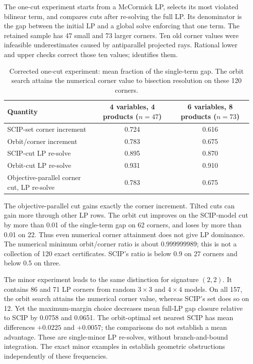 The one-cut experiment starts from a McCormick LP, selects its most
violated bilinear term, and compares cuts after re-solving the full LP.
Its denominator is the gap between the initial LP and a global solve
enforcing that one term. The retained sample has 47 small and 73 larger
corners. Ten old corner values were infeasible underestimates caused by
antiparallel projected rays. Rational lower and upper checks correct those
ten values;  identifies them.

\begin{table}[t]
\centering
\caption{Corrected one-cut experiment: mean fraction of the single-term
gap. The orbit search attains the numerical corner value to bisection
resolution on these 120 corners.}
\label{exp:one-cut-table}
\begin{tabular}{@{}p{}cc@{}}
\toprule
Quantity & \shortstack{4 variables, 4 products\\($n=47$)} & \shortstack{6 variables, 8 products\\($n=73$)} \\
\midrule
SCIP-set corner increment & 0.724 & 0.616 \\
Orbit/corner increment & 0.783 & 0.675 \\
SCIP-cut LP re-solve & 0.895 & 0.870 \\
Orbit-cut LP re-solve & 0.931 & 0.910 \\
Objective-parallel corner cut, LP re-solve & 0.783 & 0.675 \\
\bottomrule
\end{tabular}
\end{table}

The objective-parallel cut gains exactly the corner increment. Tilted
cuts can gain more through other LP rows. The orbit cut improves on the
SCIP-model cut by more than 0.01 of the single-term gap on 62 corners,
and loses by more than 0.01 on 22. Thus even numerical corner attainment
does not give LP dominance. The numerical minimum orbit/corner ratio is
about $0.999999989$; this is not a collection of 120 exact certificates.
SCIP's ratio is below 0.9 on 27 corners and below 0.5 on three.

The minor experiment leads to the same distinction for signature $(2,2)$.
It contains 86 and 71 LP corners from random $3\times3$ and $4\times4$
models. On all 157, the orbit search attains the numerical corner value,
whereas SCIP's set does so on 12. Yet the maximum-margin choice decreases
mean full-LP gap closure relative to SCIP by 0.0758 and 0.0651.
The orbit-optimal set nearest SCIP has mean differences $+0.0225$ and
$+0.0057$; the comparisons do not establish a mean advantage.
These are single-minor LP re-solves, without branch-and-bound integration.
The exact minor examples in  establish geometric
obstructions independently of these frequencies.

